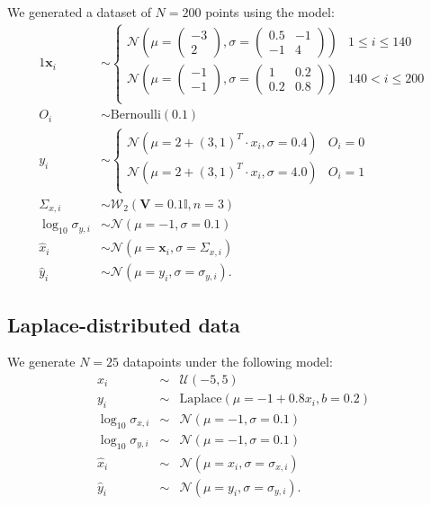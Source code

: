 \documentclass[fleqn,usenatbib]{rasti}
\begin{document}
We generated a dataset of $N = 200$ points using the model:
\begin{alignat}{1}
    \boldsymbol{x}_i& \sim
    \begin{cases}
        \mathcal N \left(
            \mu = \begin{pmatrix} -3 \\ 2 \end{pmatrix},
            \sigma = \begin{pmatrix} 0.5 & -1 \\ -1 & 4 \end{pmatrix}
        \right) &
            1 \leqslant i \leqslant 140 \\
        \mathcal N \left(
            \mu = \begin{pmatrix} -1 \\ -1 \end{pmatrix},
            \sigma = \begin{pmatrix} 1 & 0.2 \\ 0.2 & 0.8 \end{pmatrix}
        \right) &
            140 < i \leqslant 200 \\
    \end{cases}\\
    O_i& \sim \mathrm{Bernoulli}(0.1) \\
    y_i& \sim
    \begin{cases}
        \mathcal N (\mu = 2 + (3, 1)^T \cdot x_i, \sigma = 0.4) &
            O_i = 0 \\
        \mathcal N (\mu = 2 + (3, 1)^T \cdot x_i, \sigma = 4.0) &
            O_i = 1 \\
    \end{cases}\\
    \Sigma_{x, i}& \sim \mathcal W_2 (\boldsymbol{V} = 0.1 \mathbb{I}, n = 3) \\
    \log_{10} \sigma_{y, i}& \sim \mathcal N (\mu = -1, \sigma = 0.1) \\
    \hat{x}_i& \sim \mathcal N (\mu = \boldsymbol{x}_i, \sigma = \Sigma_{x, i}) \\
    \hat{y}_i& \sim \mathcal N (\mu = y_i, \sigma = \sigma_{y, i}).
\end{alignat}

\subsection{Laplace-distributed data}
\label{sec:data-models.laplace}

We generate $N = 25$ datapoints under the following model:
\begin{eqnarray}
    x_i &\sim& \mathcal U (-5, 5) \\
    y_i &\sim& \mathrm{Laplace} (\mu = -1 + 0.8 x_i, b = 0.2) \\
    \log_{10} \sigma_{x, i} &\sim& \mathcal N (\mu = -1, \sigma = 0.1) \\
    \log_{10} \sigma_{y, i} &\sim& \mathcal N (\mu = -1, \sigma = 0.1) \\
    \hat{x}_i &\sim& \mathcal N (\mu = x_i, \sigma = \sigma_{x, i}) \\
    \hat{y}_i &\sim& \mathcal N (\mu = y_i, \sigma = \sigma_{y, i}).
\end{eqnarray}
\end{document}
